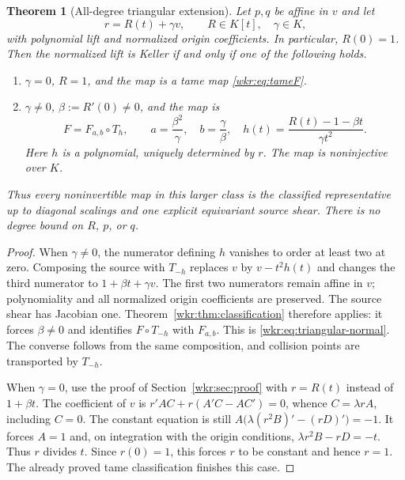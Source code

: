 \documentclass[11pt,a4paper]{article}
\numberwithin{equation}{section}
\newtheorem{theorem}{Theorem}[section]
\theoremstyle{definition}
\theoremstyle{remark}
\begin{document}
\begin{theorem}[All-degree triangular extension]\label{wkr:thm:triangular}
Let $p,q$ be affine in $v$ and let
\[
r=R(t)+\gamma v,\qquad R\in K[t],\quad \gamma\in K,
\]
with polynomial lift and normalized origin coefficients. In particular,
$R(0)=1$. Then the normalized lift is Keller if and only if one of the
following holds.
\begin{enumerate}[label=\textup{(\roman*)}]
\item $\gamma=0$, $R=1$, and the map is a tame map
\eqref{wkr:eq:tameF}.
\item $\gamma\ne0$, $\beta:=R'(0)\ne0$, and the map is
\begin{equation}\label{wkr:eq:triangular-normal}
F=F_{a,b}\circ T_h,\qquad
 a=\frac{\beta^2}{\gamma},\quad b=\frac{\gamma}{\beta},\quad
 h(t)=\frac{R(t)-1-\beta t}{\gamma t^2}.
\end{equation}
Here $h$ is a polynomial, uniquely determined by $r$. The map is
noninjective over $K$.
\end{enumerate}
Thus every noninvertible map in this larger class is the classified
representative up to diagonal scalings and one explicit equivariant source
shear. There is no degree bound on $R$, $p$, or $q$.
\end{theorem}
\begin{proof}
When $\gamma\ne0$, the numerator defining $h$ vanishes to order at least
two at zero. Composing the source with $T_{-h}$ replaces $v$ by
$v-t^2h(t)$ and changes the third numerator to $1+\beta t+\gamma v$.
The first two numerators remain affine in $v$; polynomiality and all
normalized origin coefficients are preserved. The source shear has
Jacobian one. Theorem~\ref{wkr:thm:classification} therefore applies: it
forces $\beta\ne0$ and identifies $F\circ T_{-h}$ with $F_{a,b}$.
This is \eqref{wkr:eq:triangular-normal}. The converse follows from the same
composition, and collision points are transported by $T_{-h}$.

When $\gamma=0$, use the proof of Section~\ref{wkr:sec:proof} with
$r=R(t)$ instead of $1+\beta t$. The coefficient of $v$ is
$r'AC+r(A'C-AC')=0$, whence $C=\lambda rA$, including $C=0$.
The constant equation is still
$A\bigl(\lambda(r^2B)'-(rD)'\bigr)=-1$.
It forces $A=1$ and, on integration with the origin conditions,
$\lambda r^2B-rD=-t$. Thus $r$ divides $t$. Since $r(0)=1$, this
forces $r$ to be constant and hence $r=1$. The already proved tame
classification finishes this case.
\end{proof}
\end{document}
